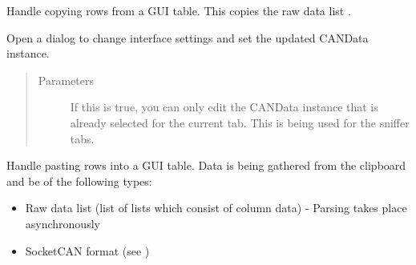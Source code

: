 \documentclass[letterpaper,10pt,english]{sphinxmanual}
\begin{document}
\begin{fulllineitems}
\begin{fulllineitems}
\end{fulllineitems}


\begin{fulllineitems}
\label{\detokenize{src:src.AbstractTab.AbstractTab.handleCopy}}
Handle copying  rows from a GUI table.
This copies the raw data list .

\end{fulllineitems}


\begin{fulllineitems}
\label{\detokenize{src:src.AbstractTab.AbstractTab.handleInterfaceSettingsDialog}}
Open a dialog to change interface settings and set the updated CANData instance.
\begin{quote}\begin{description}
\item[{Parameters}] \leavevmode
{} \textendash{} If this is true, you can only edit the CANData instance that is already selected
for the current tab. This is being used for the sniffer tabs.

\end{description}\end{quote}

\end{fulllineitems}


\begin{fulllineitems}
\label{\detokenize{src:src.AbstractTab.AbstractTab.handlePaste}}
Handle pasting rows into a GUI table.
Data is being gathered from the clipboard and be of the following types:
\begin{itemize}
\item {} 
Raw data list (list of lists which consist of column data) - Parsing takes place asynchronously

\item {} 
SocketCAN format (see )


\end{itemize}
\end{fulllineitems}
\end{fulllineitems}
\end{document}
